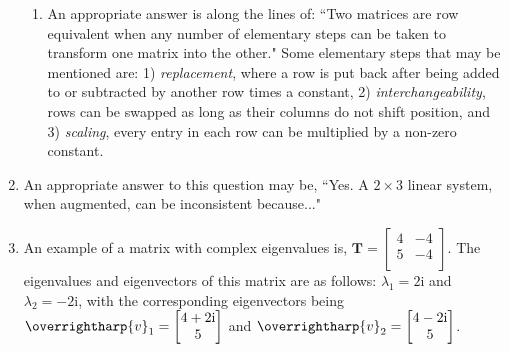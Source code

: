 \documentclass[fleqn]{article}[11pt]
\begin{document}
\begin{enumerate}
\begin{enumerate}[label=\alph*.]
			\item An appropriate answer is along the lines of: ``Two matrices are row equivalent when any number of elementary steps can be taken to transform one matrix into the other." Some elementary steps that may be mentioned are: 1) \textit{replacement}, where a row is put back after being added to or subtracted by another row times a constant, 2) \textit{interchangeability}, rows can be swapped as long as their columns do not shift position, and 3) \textit{scaling}, every entry in each row can be multiplied by a non-zero constant.
		\end{enumerate}
	
	\item An appropriate answer to this question may be, ``Yes. A $2\times3$ linear system, when augmented, can be inconsistent because..."
	
	\item An example of a matrix with complex eigenvalues is, \(\mathbf{T}=\begin{bmatrix}
			4 & -4 \\
			5 & -4 \\
		    \end{bmatrix}\). The eigenvalues and eigenvectors of this matrix are as follows: $\lambda_1=2\mathrm{i}$ and $\lambda_2=-2\mathrm{i}$, with the corresponding eigenvectors being \(\overrightharp{v}_1=\begin{bmatrix}
		    									4+2\mathrm{i} \\ 5\\													      \end{bmatrix}\) and \(\overrightharp{v}_2=\begin{bmatrix}
		    			4-2\mathrm{i} \\ 5\\												 	  \end{bmatrix}\).
	
\end{enumerate}
\end{document}

